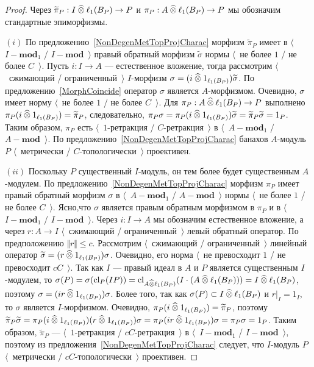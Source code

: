 \begin{proof} Через $\widetilde{\pi}_P: I\mathbin{\widehat{\otimes}} \ell_1(B_P)\to P$ и
$\pi_P:A\mathbin{\widehat{\otimes}} \ell_1(B_P)\to P$ мы обозначим стандартные эпиморфизмы.

$(i)$ По предложению~\ref{NonDegenMetTopProjCharac} морфизм $\widetilde{\pi}_P$
имеет в $\langle$~$I-\mathbf{mod}_1$ / $I-\mathbf{mod}$~$\rangle$ правый
обратный морфизм  $\widetilde{\sigma}$ нормы $\langle$~не более $1$ / не более
$C$~$\rangle$. Пусть $i:I\to A$ --- естественное вложение, тогда рассмотрим
$\langle$~сжимающий / ограниченный~$\rangle$ $I$-морфизм $\sigma=(i\mathbin{\widehat{\otimes}}
1_{\ell_1(B_P)})\widetilde{\sigma}$. По предложению~\ref{MorphCoincide} оператор
$\sigma$ является $A$-морфизмом. Очевидно, $\sigma$ имеет норму $\langle$~не
более $1$ / не более $C$~$\rangle$. Для $\pi_P:A\mathbin{\widehat{\otimes}} \ell_1(B_P)\to P$
выполнено $\pi_P(i\mathbin{\widehat{\otimes}} 1_{\ell_1(B_P)})=\widetilde{\pi}_P$, следовательно,
$\pi_P\sigma=\pi_P(i\mathbin{\widehat{\otimes}}
1_{\ell_1(B_P)})\widetilde{\sigma}=\widetilde{\pi}_P\widetilde{\sigma}=1_P$.
Таким образом, $\pi_P$ есть $\langle$~$1$-ретракция / $C$-ретракция~$\rangle$ в
$\langle$~$A-\mathbf{mod}_1$ / $A-\mathbf{mod}$~$\rangle$. По
предложению~\ref{NonDegenMetTopProjCharac} банахов $A$-модуль $P$
$\langle$~метрически / $C$-топологически~$\rangle$ проективен.

$(ii)$ Поскольку $P$ существенный $I$-модуль, он тем более будет существенным
$A$-модулем. По предложению~\ref{NonDegenMetTopProjCharac} морфизм $\pi_P$ имеет
правый обратный морфизм $\sigma$ в $\langle$~$A-\mathbf{mod}_1$ /
$A-\mathbf{mod}$~$\rangle$ нормы $\langle$~не более $1$ / не более
$C$~$\rangle$. Ясно,что $\sigma$ является правым обратным морфизмом в $\pi_P$ и
в $\langle$~$I-\mathbf{mod}_1$ / $I-\mathbf{mod}$~$\rangle$. Через $i:I\to A$ мы
обозначим естественное вложение, а через $r:A\to I$ $\langle$~сжимающий /
ограниченный~$\rangle$ левый обратный оператор. По предположению $\Vert
r\Vert\leq c$. Рассмотрим $\langle$~сжимающий / ограниченный~$\rangle$ линейный
оператор $\widetilde{\sigma}=(r\mathbin{\widehat{\otimes}} 1_{\ell_1(B_P)})\sigma$. Очевидно, его
норма $\langle$~не превосходит $1$ / не превосходит $cC$~$\rangle$. Так как $I$
--- правый идеал в $A$ и $P$ является существенным $I$-модулем, то
$\sigma(P)=\sigma(\operatorname{cl}_P(IP))=\operatorname{cl}_{A\mathbin{\widehat{\otimes}}
\ell_1(B_P)}(I\cdot (A\mathbin{\widehat{\otimes}} \ell_1(B_P)))=I\mathbin{\widehat{\otimes}} \ell_1(B_P)$, поэтому
$\sigma=(ir\mathbin{\widehat{\otimes}} 1_{\ell_1(B_P)})\sigma$. Более того, так как
$\sigma(P)\subset I\mathbin{\widehat{\otimes}}\ell_1(B_P)$ и $r|_I=1_I$, то $\sigma$ является
$I$-морфизмом. Очевидно, $\pi_P(i\mathbin{\widehat{\otimes}} 1_{\ell_1(B_P)})=\widetilde{\pi}_P$,
поэтому $\widetilde{\pi}_P\widetilde{\sigma}=\pi_P(i\mathbin{\widehat{\otimes}}
1_{\ell_1(B_P)})(r\mathbin{\widehat{\otimes}} 1_{\ell_1(B_P)})\sigma=\pi_P(ir\mathbin{\widehat{\otimes}}
1_{\ell_1(B_P)})\sigma=\pi_P\sigma=1_P$. Таким образом, $\widetilde{\pi}_P$ ---
$\langle$~$1$-ретракция / $cC$-ретракция~$\rangle$ в
$\langle$~$I-\mathbf{mod}_1$ / $I-\mathbf{mod}$~$\rangle$, поэтому из
предложения~\ref{NonDegenMetTopProjCharac} следует, что $I$-модуль $P$
$\langle$~метрически / $cC$-топологически~$\rangle$ проективен.
\end{proof}

